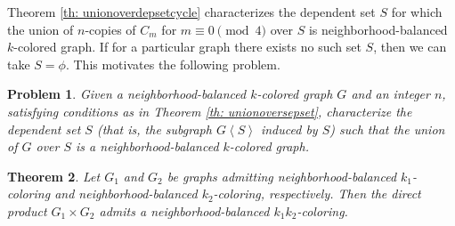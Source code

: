 \documentclass[12pt]{article}
\newtheorem{theorem}{Theorem}[section]
\newtheorem{problem}[theorem]{Problem}
\newcommand{\nbcd}{neighborhood-balanced $k$-colored\xspace}
\begin{document}
Theorem \ref{th: unionoverdepsetcycle} characterizes the dependent set $S$ for which the union of $n$-copies of $C_m$ for $m\equiv 0 \pmod{4}$ over $S$ is \nbcd graph. If for a particular graph there exists no such set $S$, then we can take $S=\phi$. This motivates the following problem.
\begin{problem}
    Given a \nbcd graph $G$ and an integer $n$, satisfying conditions as in Theorem \ref{th: unionoversepset}, characterize the dependent set $S$ (that is, the subgraph $G\left< S \right>$ induced by $S$) such that the union of $G$ over $S$ is a \nbcd graph.
\end{problem}

\begin{theorem} Let $G_1$ and $G_2$ be graphs admitting neighborhood-balanced $k_1$-coloring and neighborhood-balanced $k_2$-coloring, respectively. Then the direct product $G_1\times G_2$ admits a neighborhood-balanced $k_1k_2$-coloring.
\end{theorem}
\end{document}
